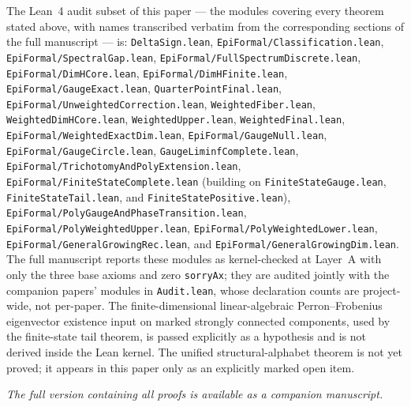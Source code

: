 The Lean~4 audit subset of this paper --- the modules covering every theorem
stated above, with names transcribed verbatim from the corresponding sections
of the full manuscript --- is: \texttt{DeltaSign.lean},
\texttt{EpiFormal/Classification.lean}, \texttt{EpiFormal/SpectralGap.lean},
\texttt{EpiFormal/FullSpectrumDiscrete.lean}, \texttt{EpiFormal/DimHCore.lean},
\texttt{EpiFormal/DimHFinite.lean}, \texttt{EpiFormal/GaugeExact.lean},
\texttt{QuarterPointFinal.lean}, \texttt{EpiFormal/UnweightedCorrection.lean},
\texttt{WeightedFiber.lean}, \texttt{WeightedDimHCore.lean},
\texttt{WeightedUpper.lean}, \texttt{WeightedFinal.lean},
\texttt{EpiFormal/WeightedExactDim.lean}, \texttt{EpiFormal/GaugeNull.lean},
\texttt{EpiFormal/GaugeCircle.lean}, \texttt{GaugeLiminfComplete.lean},
\texttt{EpiFormal/TrichotomyAndPolyExtension.lean},
\texttt{EpiFormal/FiniteStateComplete.lean} (building on
\texttt{FiniteStateGauge.lean}, \texttt{FiniteStateTail.lean}, and
\texttt{FiniteStatePositive.lean}),
\texttt{EpiFormal/PolyGaugeAndPhaseTransition.lean},
\texttt{EpiFormal/PolyWeightedUpper.lean},
\texttt{EpiFormal/PolyWeightedLower.lean},
\texttt{EpiFormal/GeneralGrowingRec.lean}, and
\texttt{EpiFormal/GeneralGrowingDim.lean}. The full manuscript reports these
modules as kernel-checked at Layer~A with only the three base axioms and zero
\texttt{sorryAx}; they are audited jointly with the companion papers' modules
in \texttt{Audit.lean}, whose declaration counts are project-wide, not
per-paper. The finite-dimensional linear-algebraic Perron--Frobenius
eigenvector existence input on marked strongly connected components, used by
the finite-state tail theorem, is passed explicitly as a hypothesis and is not
derived inside the Lean kernel. The unified structural-alphabet theorem is not
yet proved; it appears in this paper only as an explicitly marked open item.

\emph{The full version containing all proofs is available as a companion manuscript.}
